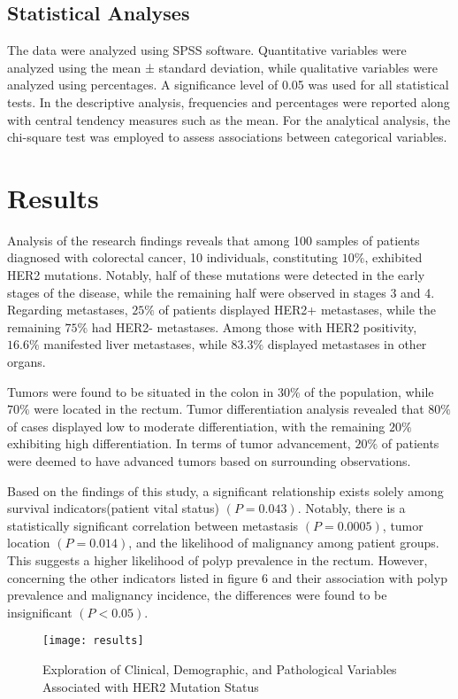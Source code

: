 \documentclass[12pt]{article}
\begin{document}
\subsection{Statistical Analyses}
The data were analyzed using SPSS software. Quantitative variables were analyzed using the mean ± standard deviation, while qualitative variables were analyzed using percentages. A significance level of 0.05 was used for all statistical tests. In the descriptive analysis, frequencies and percentages were reported along with central tendency measures such as the mean. For the analytical analysis, the chi-square test was employed to assess associations between categorical variables.

\section{Results}
Analysis of the research findings reveals that among 100 samples of patients diagnosed with colorectal cancer, 10 individuals, constituting $10\%$, exhibited HER2 mutations. Notably, half of these mutations were detected in the early stages of the disease, while the remaining half were observed in stages 3 and 4. Regarding metastases, $25\%$ of patients displayed HER2+ metastases, while the remaining $75\%$ had HER2- metastases. Among those with HER2 positivity, $16.6\%$ manifested liver metastases, while $83.3\%$ displayed metastases in other organs.

Tumors were found to be situated in the colon in $30\%$ of the population, while $70\%$ were located in the rectum. Tumor differentiation analysis revealed that $80\%$ of cases displayed low to moderate differentiation, with the remaining $20\%$ exhibiting high differentiation. In terms of tumor advancement, $20\%$ of patients were deemed to have advanced tumors based on surrounding observations.

Based on the findings of this study, a significant relationship exists solely among survival indicators(patient vital status) $(P=0.043)$. Notably, there is a statistically significant correlation between metastasis $(P=0.0005)$, tumor location $(P=0.014)$, and the likelihood of malignancy among patient groups. This suggests a higher likelihood of polyp prevalence in the rectum. However, concerning the other indicators listed in figure 6 and their association with polyp prevalence and malignancy incidence, the differences were found to be insignificant $(P<0.05)$.

\begin{figure}[htbp]
\centering
\texttt{[image: results]}\\
\caption{Exploration of Clinical, Demographic, and Pathological Variables Associated with HER2 Mutation Status}
\end{figure}
\end{document}
